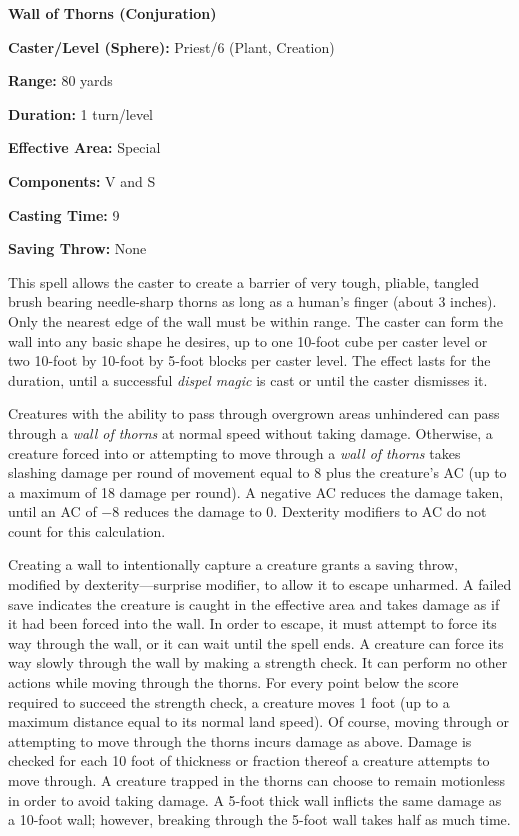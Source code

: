\begin{multicols}{2}
\vspace{1em}

\noindent
\begin{minipage}{\columnwidth}

\noindent \textbf{Wall of Thorns (Conjuration)}

\noindent \textbf{Caster/Level (Sphere):} Priest/6 (Plant, Creation)

\noindent \textbf{Range:} 80 yards

\noindent \textbf{Duration:} 1 turn/level

\noindent \textbf{Effective Area:} Special

\noindent \textbf{Components:} V and S

\noindent \textbf{Casting Time:} 9

\noindent \textbf{Saving Throw:} None

\end{minipage}

This spell allows the caster to create a barrier of very tough, pliable, tangled brush bearing needle-sharp thorns as long as a human's finger (about 3 inches).  Only the nearest edge of the wall must be within range.  The caster can form the wall into any basic shape he desires, up to one 10-foot cube per caster level or two 10-foot by 10-foot by 5-foot blocks per caster level.  The effect lasts for the duration, until a successful \textit{dispel magic} is cast or until the caster dismisses it.

Creatures with the ability to pass through overgrown areas unhindered can pass through a \textit{wall of thorns} at normal speed without taking damage.  Otherwise, a creature forced into or attempting to move through a \textit{wall of thorns} takes slashing damage per round of movement equal to 8 plus the creature's AC (up to a maximum of 18 damage per round).  A negative AC reduces the damage taken, until an AC of $-8$ reduces the damage to 0.  Dexterity modifiers to AC do not count for this calculation.  

Creating a wall to intentionally capture a creature grants a saving throw, modified by dexterity---surprise modifier, to allow it to escape unharmed.  A failed save indicates the creature is caught in the effective area and takes damage as if it had been forced into the wall.  In order to escape, it must attempt to force its way through the wall, or it can wait until the spell ends.  A creature can force its way slowly through the wall by making a strength check.  It can perform no other actions while moving through the thorns.  For every point below the score required to succeed the strength check, a creature moves 1 foot (up to a maximum distance equal to its normal land speed).  Of course, moving through or attempting to move through the thorns incurs damage as above.  Damage is checked for each 10 foot of thickness or fraction thereof a creature attempts to move through.  A creature trapped in the thorns can choose to remain motionless in order to avoid taking damage.  A 5-foot thick wall inflicts the same damage as a 10-foot wall; however, breaking through the 5-foot wall takes half as much time.  


\end{multicols}

